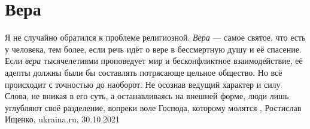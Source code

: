  
 
 
 
 
\chapter{Вера}
\label{sec:slova.vera}

Я не случайно обратился к проблеме религиозной. \emph{Вера} — самое святое, что есть у
человека, тем более, если речь идёт о вере в бессмертную душу и её спасение.
Если \emph{вера} тысячелетиями проповедует мир и бесконфликтное взаимодействие, её
адепты должны были бы составлять потрясающе цельное общество. Но всё происходит
с точностью до наоборот. Не осознав ведущий характер и силу Слова, не вникая в
его суть, а останавливаясь на внешней форме, люди лишь углубляют своё
разделение, вопреки воле Господа, которому молятся
, 
Ростислав Ищенко, ukraina.ru, 30.10.2021
